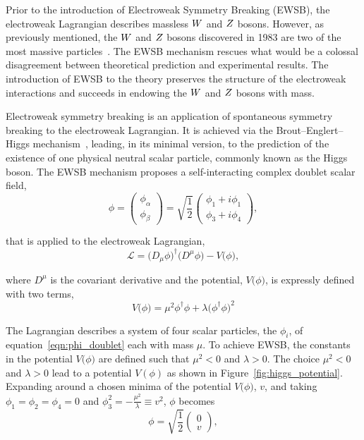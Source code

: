 Prior to the introduction of Electroweak Symmetry Breaking (EWSB),
the electroweak Lagrangian describes massless $W$ and $Z$ bosons.
However, as previously mentioned, the $W$ and $Z$ bosons discovered in 1983
are two of the most massive particles~\cite{AUBERT1983275,1983398}. 
The EWSB mechanism rescues what would be a colossal disagreement between theoretical prediction
and experimental results. The introduction of EWSB to the theory preserves the structure of
the electroweak interactions and succeeds in endowing the $W$ and $Z$ bosons
with mass.

Electroweak symmetry breaking is an application of spontaneous symmetry breaking to
the electroweak Lagrangian. It is achieved via the Brout--Englert--Higgs
mechanism~\cite{Englert:1964et,Higgs:1964ia,Higgs:1964pj,Guralnik:1964eu,Higgs:1966ev,Kibble:1967sv},
leading, in its minimal version, to the prediction of the existence of one physical neutral scalar particle,
commonly known as the Higgs boson. The EWSB mechanism
proposes a self-interacting complex doublet scalar field,
\begin{equation}
\phi = \begin{pmatrix} \phi_{\alpha} \\ \phi_{\beta} \end{pmatrix} = 
    \sqrt{\frac{1}{2}} \begin{pmatrix}\phi_{1} + i\phi_{1} \\ \phi_{3} + i\phi_{4} \end{pmatrix},
\label{eqn:phi_doublet}
\end{equation}

that is applied to the electroweak Lagrangian, 
\begin{equation}
\mathcal{L} = \big(D_{\mu}\phi\big)^{\dagger} \big(D^{\mu}\phi\big) - V\big(\phi\big),
\end{equation}

where $D^{\mu}$ is the covariant derivative and the potential, $V\big(\phi\big)$, 
is expressly defined with two terms, 
\begin{equation}
V\big(\phi\big) = \mu^{2}\phi^{\dagger}\phi + \lambda\big(\phi^{\dagger}\phi\big)^{2}
\label{eqn:v_pot}
\end{equation}

The Lagrangian describes a system of four scalar particles, the $\phi_{i}$,
of equation~\ref{eqn:phi_doublet} each with mass $\mu$. 
To achieve EWSB, the constants in the potential $V\big(\phi\big)$ are defined such that $\mu^{2} < 0$
and $\lambda > 0$. The choice $\mu^{2} < 0$ and $\lambda > 0$ lead to a potential $V\left(\phi\right)$
as shown in Figure~\ref{fig:higgs_potential}. Expanding around a chosen minima of the potential
$V\big(\phi\big)$, $v$, and taking $\phi_{1} = \phi_{2} = \phi_{4} = 0$ and
$\phi_{3}^{2} = -\frac{\mu^{2}}{\lambda} \equiv v^{2}$, $\phi$ becomes
\begin{equation}
\phi = \sqrt{\frac{1}{2}} \begin{pmatrix} 0 \\ v \end{pmatrix},
\label{eqn:phi_doublet_exp}
\end{equation}

